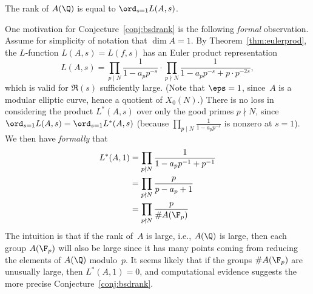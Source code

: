 \documentclass{report}
\begin{document}
\begin{conjecture}\label{conj:bsdrank}
  The rank of $A(\Q)$ is equal to $\ord_{s=1}L(A,s)$.
\end{conjecture}

One motivation for Conjecture~\ref{conj:bsdrank} is the following {\em formal}
observation.  Assume for simplicity of notation that $\dim A=1$.  By
Theorem~\ref{thm:eulerprod}, the $L$-function $L(A,s)=L(f,s)$ has an
Euler product representation
$$
L(A,s) = \prod_{p\mid N} \frac{1}{1 - a_p p^{-s}}\cdot
  \prod_{p\nmid N}\frac{1}{1-a_p p^{-s} + p\cdot p^{-2s}},
$$
which is valid for $\Re(s)$ sufficiently large.
(Note that $\eps=1$, since~$A$ is a modular elliptic curve, hence
a quotient of $X_0(N)$.)
There is no loss in considering the product $L^*(A,s)$ over only
the good primes $p\nmid N$, since $\ord_{s=1}L(A,s) = \ord_{s=1} L^*(A,s)$
(because $\prod_{p\mid N} \frac{1}{1 - a_p p^{-s}}$ is nonzero at $s=1$).
We then have {\em formally} that
\begin{align*}
 L^*(A,1) &= \prod_{p\nmid N} \frac{1}{1-a_p p^{-1} + p^{-1}}\\
          &= \prod_{p\nmid N} \frac{p}{p - a_p + 1}\\
          &= \prod_{p\nmid N} \frac{p}{\# A(\F_p)}
\end{align*}
The intuition is that if the rank of~$A$ is large, i.e., $A(\Q)$ is
large, then each group $A(\F_p)$ will also be large since it has many
points coming from reducing the elements of $A(\Q)$ modulo~$p$.  It
seems likely that if the groups $\# A(\F_p)$ are unusually large, then
$L^*(A,1)=0$, and computational evidence suggests the more precise
Conjecture~\ref{conj:bsdrank}.
\end{document}
